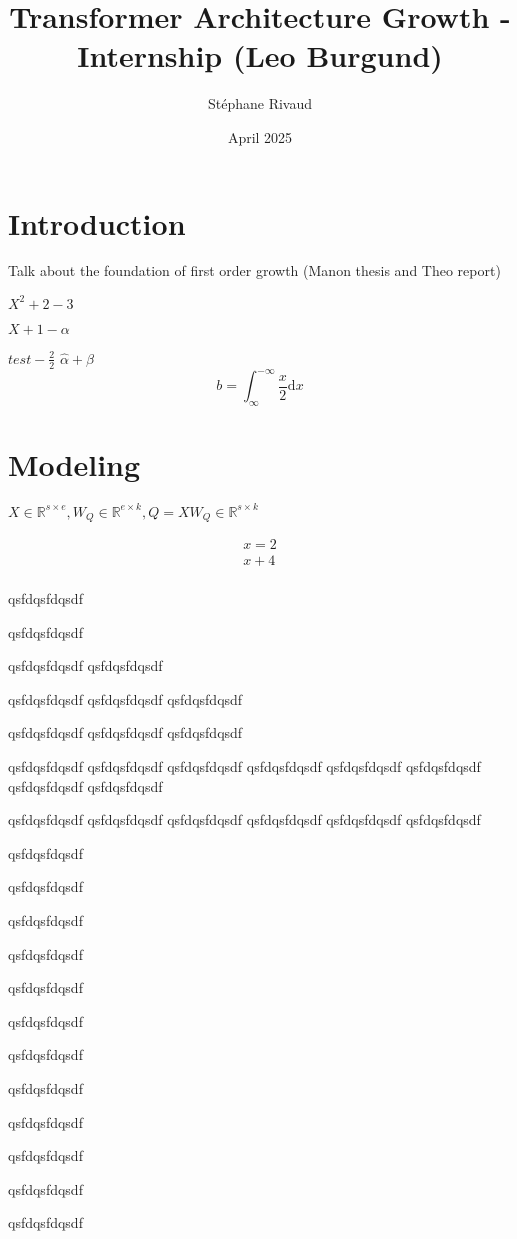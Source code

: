 \documentclass{article}
\title{Transformer Architecture Growth - Internship (Leo Burgund)}
\author{Stéphane Rivaud}
\date{April 2025}
\begin{document}
\maketitle

\section{Introduction}
Talk about the foundation of first order growth (Manon thesis and Theo report)

\( X ^2 + 2 -3 \)

\( X + 1 - \alpha  \)

$test - \frac{2}{2}$
$\hat{\alpha} + \hat{\beta}$
$$
b=\int_{\infty }^{-\infty} \frac{x}{2} \mathrm{d}x
$$

\section{Modeling}
$X \in \mathbb{R}^{s \times e}, W_Q \in \mathbb{R}^{e\times k} , Q=XW_Q \in \mathbb{R}^{s \times  k}$

$$
\begin{aligned}
  x=2\\
  x+4\\
\end{aligned}
$$

qsfdqsfdqsdf

qsfdqsfdqsdf

qsfdqsfdqsdf
qsfdqsfdqsdf

qsfdqsfdqsdf
qsfdqsfdqsdf
qsfdqsfdqsdf

qsfdqsfdqsdf
qsfdqsfdqsdf
qsfdqsfdqsdf

qsfdqsfdqsdf
qsfdqsfdqsdf
qsfdqsfdqsdf
qsfdqsfdqsdf
qsfdqsfdqsdf
qsfdqsfdqsdf
qsfdqsfdqsdf
qsfdqsfdqsdf

qsfdqsfdqsdf
qsfdqsfdqsdf
qsfdqsfdqsdf
qsfdqsfdqsdf
qsfdqsfdqsdf
qsfdqsfdqsdf

qsfdqsfdqsdf


qsfdqsfdqsdf


qsfdqsfdqsdf


qsfdqsfdqsdf


qsfdqsfdqsdf


qsfdqsfdqsdf


qsfdqsfdqsdf


qsfdqsfdqsdf


qsfdqsfdqsdf


qsfdqsfdqsdf


qsfdqsfdqsdf


qsfdqsfdqsdf
\end{document}
